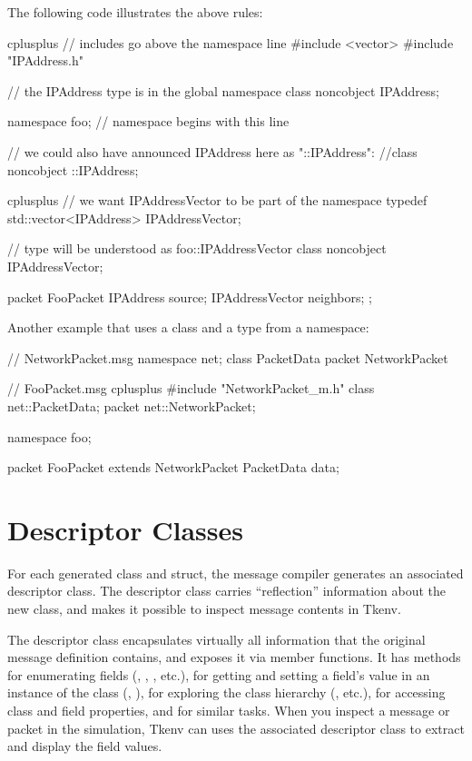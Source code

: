 The following code illustrates the above rules:

\begin{msg}
cplusplus {{
// includes go above the namespace line
#include <vector>
#include "IPAddress.h"
}}

// the IPAddress type is in the global namespace
class noncobject IPAddress;

namespace foo;  // namespace begins with this line

// we could also have announced IPAddress here as "::IPAddress":
//class noncobject ::IPAddress;

cplusplus {{
// we want IPAddressVector to be part of the namespace
typedef std::vector<IPAddress> IPAddressVector;
}}

// type will be understood as foo::IPAddressVector
class noncobject IPAddressVector;

packet FooPacket {
    IPAddress source;
    IPAddressVector neighbors;
};
\end{msg}

Another example that uses a  class and a  type
from a  namespace:

\begin{msg}
// NetworkPacket.msg
namespace net;
class PacketData { }
packet NetworkPacket { }
\end{msg}

\begin{msg}
// FooPacket.msg
cplusplus {{
#include "NetworkPacket_m.h"
}}
class net::PacketData;
packet net::NetworkPacket;

namespace foo;

packet FooPacket extends NetworkPacket
{
    PacketData data;
}
\end{msg}



\section{Descriptor Classes}
\label{sec:msg-defs:descriptor-classes}

For each generated class and struct, the message compiler generates an
associated descriptor class. The descriptor class carries ``reflection''
information about the new class, and makes it possible to inspect message
contents in Tkenv.

The descriptor class encapsulates virtually all information that the
original message definition contains, and exposes it via member functions.
It has methods for enumerating fields (,
, , etc.), for getting
and setting a field's value in an instance of the class
(, ), for exploring the
class hierarchy (, etc.), for accessing
class and field properties, and for similar tasks. When you inspect a
message or packet in the simulation, Tkenv can uses the associated
descriptor class to extract and display the field values.

